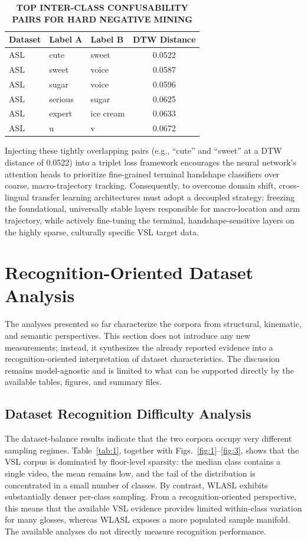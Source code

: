 \documentclass{ieeeaccess}
\DeclareRobustCommand{\textbf}[1]{{\bfseries #1}}
\begin{document}
\begin{table}[htbp]
\caption{\textbf{TOP INTER-CLASS CONFUSABILITY PAIRS FOR HARD NEGATIVE MINING}}
\label{tab:hard_negatives}
\centering
\setlength{\tabcolsep}{6pt}
\begin{tabular}{|l|l|l|c|}
\hline
\textbf{Dataset} & \textbf{Label A} & \textbf{Label B} & \textbf{DTW Distance} \\
\hline
ASL & cute & sweet & 0.0522 \\
ASL & sweet & voice & 0.0587 \\
ASL & sugar & voice & 0.0596 \\
ASL & serious & sugar & 0.0625 \\
ASL & expert & ice cream & 0.0633 \\
ASL & u & v & 0.0672 \\
\hline
\end{tabular}
\end{table}

Injecting these tightly overlapping pairs (e.g., ``cute'' and ``sweet'' at a DTW distance of 0.0522) into a triplet loss framework encourages the neural network's attention heads to prioritize fine-grained terminal handshape classifiers over coarse, macro-trajectory tracking. Consequently, to overcome domain shift, cross-lingual transfer learning architectures must adopt a decoupled strategy: freezing the foundational, universally stable layers responsible for macro-location and arm trajectory, while actively fine-tuning the terminal, handshape-sensitive layers on the highly sparse, culturally specific VSL target data.

\section{Recognition-Oriented Dataset Analysis}
\label{sec:recognition_oriented_dataset_analysis}

The analyses presented so far characterize the corpora from structural, kinematic, and semantic perspectives. This section does not introduce any new measurements; instead, it synthesizes the already reported evidence into a recognition-oriented interpretation of dataset characteristics. The discussion remains model-agnostic and is limited to what can be supported directly by the available tables, figures, and summary files.

\subsection{Dataset Recognition Difficulty Analysis}
The dataset-balance results indicate that the two corpora occupy very different sampling regimes. Table~\ref{tab:1}, together with Figs.~\ref{fig:1}--\ref{fig:3}, shows that the VSL corpus is dominated by floor-level sparsity: the median class contains a single video, the mean remains low, and the tail of the distribution is concentrated in a small number of classes. By contrast, WLASL exhibits substantially denser per-class sampling. From a recognition-oriented perspective, this means that the available VSL evidence provides limited within-class variation for many glosses, whereas WLASL exposes a more populated sample manifold. The available analyses do not directly measure recognition performance.
\end{document}
